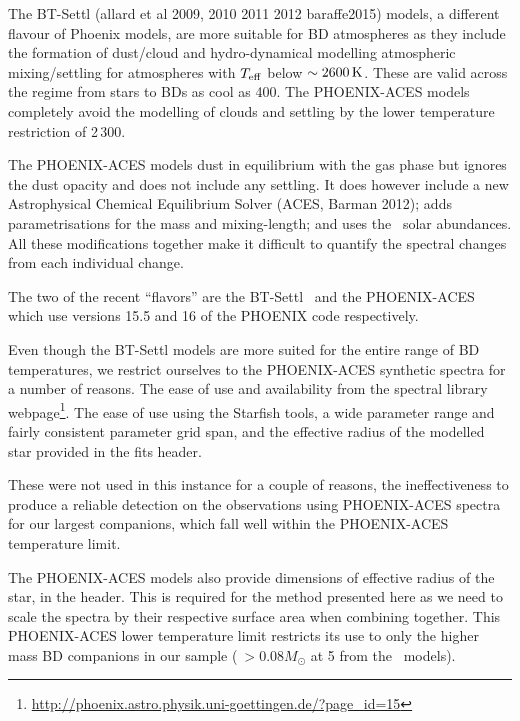 \label{bt-setll-junk}
The {BT-Settl} (allard et al 2009, 2010 2011 2012 baraffe2015) models, a different flavour of Phoenix models, are more suitable for {BD} atmospheres as they include the formation of dust/cloud and hydro-dynamical modelling atmospheric mixing/settling for atmospheres with \(T_{\mathrm{eff}}{}\) below \(\sim2600\,\si{\kelvin}{}\).
These are valid across the regime from stars to BDs as cool as 400\K{}.
The {PHOENIX-ACES} models completely avoid the modelling of clouds and settling by the lower temperature restriction of 2\,300\K{}.

The {PHOENIX-ACES} models dust in equilibrium with the gas phase but ignores the dust opacity and does not include any settling.
It does however include a new Astrophysical Chemical Equilibrium Solver (ACES,
Barman 2012); adds parametrisations for the mass and mixing-length; and uses the~\citet{asplund_chemical_2009} solar abundances.
All these modifications together make it difficult to quantify the spectral changes from each individual change.

The two of the recent ``flavors'' are the {BT-Settl}~\citep{allard_model_2010, baraffe_new_2015} and the {PHOENIX-ACES}~\citep{husser_new_2013} which use versions 15.5 and 16 of the {PHOENIX} code respectively.

Even though the {BT-Settl} models are more suited for the entire range of {BD} temperatures, we restrict ourselves to the {PHOENIX-ACES} synthetic spectra for a number of reasons.
The ease of use and availability from the spectral library webpage\footnote{\url{http://phoenix.astro.physik.uni-goettingen.de/?page_id=15}}.
The ease of use using the Starfish tools, a wide parameter range and fairly consistent parameter grid span, and the effective radius of the modelled star provided in the fits header.

These were not used in this instance for a couple of reasons, the ineffectiveness to produce a reliable detection on the observations using  {PHOENIX-ACES}  spectra for our largest companions, which fall well within the  {PHOENIX-ACES}  temperature limit.

The {PHOENIX-ACES} models also provide dimensions of effective radius of the star, in the header.
This is required for the method presented here as we need to scale the spectra by their respective surface area when combining together.
This {PHOENIX-ACES} lower temperature limit restricts its use to only the higher mass {BD} companions in our sample (\(~>0.08 M_{\odot}\) at 5\Gyr{} from the~\citet{baraffe_evolutionary_2003} models).


